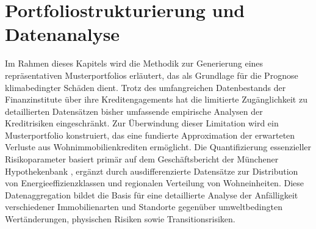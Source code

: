 \section{Portfoliostrukturierung und Datenanalyse}\label{sec:createportfolio}

Im Rahmen dieses Kapitels wird die Methodik zur Generierung eines repräsentativen Musterportfolios erläutert, das als Grundlage für die Prognose klimabedingter Schäden dient. Trotz des umfangreichen Datenbestands der Finanzinstitute über ihre Kreditengagements hat die limitierte Zugänglichkeit zu detaillierten Datensätzen bisher umfassende empirische Analysen der Kreditrisiken eingeschränkt. Zur Überwindung dieser Limitation wird ein Musterportfolio konstruiert, das eine fundierte Approximation der erwarteten Verluste aus Wohnimmobilienkrediten ermöglicht. Die Quantifizierung essenzieller Risikoparameter basiert primär auf dem Geschäftsbericht der Münchener Hypothekenbank \parencite{MuenchenerHyp2023}, ergänzt durch ausdifferenzierte Datensätze zur Distribution von Energieeffizienzklassen und regionalen Verteilung von Wohneinheiten. Diese Datenaggregation bildet die Basis für eine detaillierte Analyse der Anfälligkeit verschiedener Immobilienarten und Standorte gegenüber umweltbedingten Wertänderungen, physischen Risiken sowie Transitionsrisiken. 







